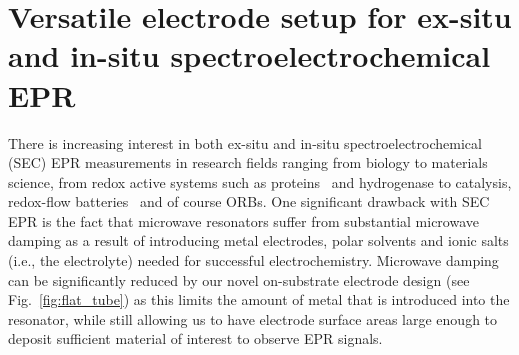 \section{Versatile electrode setup for ex-situ and in-situ spectroelectrochemical EPR}\label{electrode_setup}
%
There is increasing interest in both ex-situ and in-situ spectroelectrochemical (SEC) EPR measurements in research fields ranging from biology to materials science, from redox active systems such as proteins~\cite{abdiaziz2019_chemcomm} and hydrogenase to catalysis,\cite{kutin2019_catalysis, neukermans2020_chemelectrochem, bonke2021_natrev, priebe2013_angewandte, rabeah2015_angewandte} redox-flow batteries~\cite{zhao2021_jacs} and of course ORBs.\cite{huang2016_jpowersources, kanzaki2018_acsappmat} One significant drawback with SEC EPR is the fact that microwave resonators suffer from substantial microwave damping as a result of introducing metal electrodes, polar solvents and ionic salts (i.e., the electrolyte) needed for successful electrochemistry.\cite{wadhawan2007_encofelectrochem} Microwave damping can be significantly reduced by our novel on-substrate electrode design (see Fig.~\ref{fig:flat_tube}) as this limits the amount of metal that is introduced into the resonator, while still allowing us to have electrode surface areas large enough to deposit sufficient material of interest to observe EPR signals.

